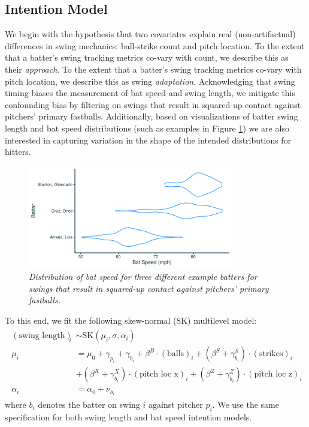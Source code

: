 \documentclass{article}
\begin{document}
    \subsection{Intention Model}
    \label{sec:methods-intention}

    We begin with the hypothesis that two covariates explain real (non-artifactual) differences in swing mechanics: ball-strike count and pitch location. To the extent that a batter's swing tracking metrics co-vary with count, we describe this as their \textit{approach}. To the extent that a batter's swing tracking metrics co-vary with pitch location, we describe this as swing \textit{adaptation}. Acknowledging that swing timing biases the measurement of bat speed and swing length, we mitigate this confounding bias by filtering on swings that result in squared-up contact against pitchers' primary fastballs. Additionally, based on visualizations of batter swing length and bat speed distributions (such as examples in Figure \ref{fig:ex-bat-speed}) we are also interested in capturing variation in the shape of the intended distributions for hitters. 

    \begin{figure}[H]
      \centering
      \includegraphics[width = 0.8\textwidth]{../../figures/ex_speed_intent_distr.pdf}
      \caption{\it Distribution of bat speed for three different example batters for swings that result in squared-up contact against pitchers' primary fastballs.}
      \label{fig:ex-bat-speed}
    \end{figure}

    To this end, we fit the following skew-normal (SK) multilevel model:
    \begin{align}
    \label{eqn:intention-swing-length}
    \begin{split}
        ( \mbox{swing length} )_i &\sim \mbox{SK}(\mu_i, \sigma, \alpha_i) \\
        \mu_i &= \mu_0 + \gamma_{p_i} + \gamma_{b_i}
        + \beta^B \cdot (\mbox{balls})_i
          + (\beta^S + \gamma^S_{b_i}) \cdot (\mbox{strikes})_i\\
        & + (\beta^X + \gamma^X_{b_i}) \cdot (\mbox{pitch loc x})_i
          + (\beta^Z + \gamma^Z_{b_i}) \cdot (\mbox{pitch loc z})_i \\
          \alpha_i &= \alpha_0 + \nu_{b_i}
    \end{split}
    \end{align}
    where $b_i$ denotes the batter on swing $i$ against pitcher $p_i$. We use the same specification for both swing length and bat speed intention models. 
    
\end{document}
